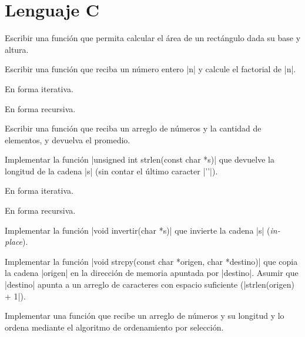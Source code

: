 \chapter{Lenguaje C}

\begin{ejercicio}
Escribir una función que permita calcular el área de un rectángulo dada
su base y altura.
\end{ejercicio}

\begin{ejercicio}
Escribir una función que reciba un número entero |n| y calcule el factorial de
|n|.
\begin{partes}
    \item En forma iterativa.
    \item En forma recursiva.
\end{partes}
\end{ejercicio}

\begin{ejercicio}
Escribir una función que reciba un arreglo de números y la cantidad de
elementos, y devuelva el promedio.
\end{ejercicio}

\begin{ejercicio}
Implementar la función |unsigned int strlen(const char *s)| que devuelve la
longitud de la cadena |s| (sin contar el último caracter |'\0'|).
\begin{partes}
    \item En forma iterativa.
    \item En forma recursiva.
\end{partes}
\end{ejercicio}

\begin{ejercicio}
Implementar la función |void invertir(char *s)| que invierte la cadena
|s| ({\it in-place}).
\end{ejercicio}

\begin{ejercicio}
Implementar la función |void strcpy(const char *origen, char *destino)| que
copia la cadena |origen| en la dirección de memoria apuntada por |destino|.
Asumir que |destino| apunta a un arreglo de caracteres con espacio suficiente
(|strlen(origen) + 1|).
\end{ejercicio}

\begin{ejercicio}
Implementar una función que recibe un arreglo de números y su longitud y
lo ordena mediante el algoritmo de ordenamiento por selección.
\end{ejercicio}

